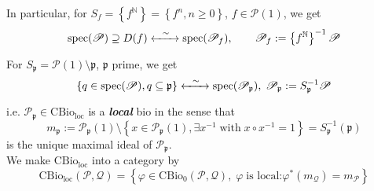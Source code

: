 \documentclass[leqno]{article}
\newcommand{\pid}{\mathfrak{p}}
\newcommand{\myemph}[1]{{\it{\bf{#1}}}}
\newcommand{\N}{\mathbb{N}}
\newcommand{\biop}{\mathscr{P}}
\newcommand{\bioq}{\mathscr{Q}}
\numberwithin{equation}{section}
\begin{document}
In particular, for $S_{f}=\left\{ f^{\N} \right\}=\left\{ f^{n},n\ge 0 \right\}$,
$f\in\biop(1)$, we get 
\begin{equation}
				\text{spec}(\biop)\supseteq
				D(f)\xleftrightarrow[\qquad]{\sim}\text{spec}(\biop_{f}), \qquad
				\biop_{f}:= \left\{ f^{\N} \right\}^{-1}\biop
				\label{eq:5.14}
\end{equation}
For $S_{\pid}=\biop(1)\setminus \pid$, $\pid$ prime, we get 
\begin{equation}
				\left\{ q\in\text{spec}(\biop),q\subseteq \pid \right\}
				\xleftrightarrow[\qquad]{\sim}\text{spec}(\biop_{\pid}),\;\biop_{\pid}:=S_{\pid}^{-1}\biop
				\label{eq:5.15}
\end{equation}
i.e. $\biop_{\pid}\in \text{CBio}_{\text{loc}}$ is a \myemph{local} bio in the sense that
\begin{equation}
				m_{\pid}:=\biop_{\pid}(1)\setminus \left\{ x\in \biop_{\pid}(1),\exists x^{-1}\;\text{with}\;
				x\circ x^{-1}=1 \right\}=S_{\pid}^{-1}(\pid)
				\label{eq:5.16}
\end{equation}
is the unique maximal ideal of $\biop_{\pid}$. \\
We make $\text{CBio}_{\text{loc}}$ into a category by 
\begin{equation}
				\text{CBio}_{\text{loc}}(\biop,\bioq)=\left\{ \varphi\in
				\text{CBio}_0(\biop,\bioq),\; \varphi\;\text{is local:
$\varphi^{\ast}(m_{\bioq})=m_{\biop}$} \right\}
\label{eq:5.17}
\end{equation}
\end{document}
